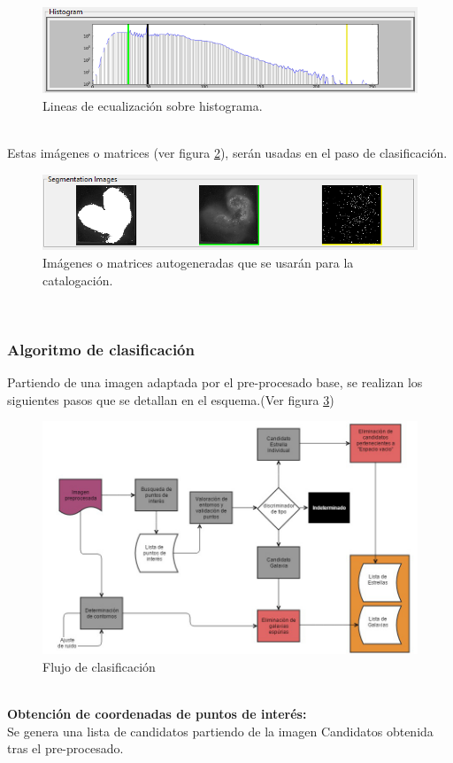 	\begin{figure}[!htb]
		\centering
		\includegraphics[width=1\textwidth]{images/histLines.png}
		\caption{\label{fig:histLines}{\small Lineas de ecualización sobre histograma.}}
	\end{figure}
	\\
	Estas imágenes o matrices  (ver figura \ref{fig:imagenesAutoGeneradas}), serán usadas en el paso de clasificación.
	\begin{figure}[!htb]
		\centering
		\includegraphics[width=1\textwidth]{images/imagenesAutoGeneradas.png}
		\caption{\label{fig:imagenesAutoGeneradas}{\small Imágenes o matrices autogeneradas que se usarán para la catalogación.}}
	\end{figure}
	\\
	\newpage
	\subsubsection{Algoritmo de clasificación}
	Partiendo de una imagen adaptada por el pre-procesado base, se realizan los siguientes pasos que se detallan en el esquema.(Ver figura \ref{fig:esquemaClasificaciosn})\\
	\begin{figure}[!htb]
		\centering
		\includegraphics[width=1\textwidth]{images/tfg2016algoritmos_de_catalogaci_n.jpg}
		\caption{\label{fig:esquemaClasificaciosn}Flujo de clasificación}
	\end{figure}
	\\
	\textbf{Obtención de coordenadas de puntos de interés:} \\
	Se genera una lista de candidatos partiendo de la imagen {\scriptsize Candidatos} obtenida tras el pre-procesado.
	
